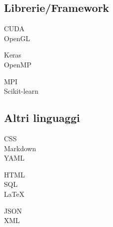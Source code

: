 \documentclass[curriculum-vitae-ita]{subfiles}
\begin{document}
		\subsection*{Librerie/Framework}
			\begin{minipage}[t]{.3\textwidth}
				CUDA \hfill {}\\
				OpenGL \hfill {}\\
			\end{minipage}
			\hfill
			\begin{minipage}[t]{.3\textwidth}
				Keras \hfill {}\\
				OpenMP \hfill {}\\
			\end{minipage}
			\hfill
			\begin{minipage}[t]{.3\textwidth}
				MPI \hfill {}\\
				Scikit-learn \hfill {}\\
			\end{minipage}
		
		\subsection*{Altri linguaggi}
			\begin{minipage}[t]{.3\textwidth}
				CSS \hfill {}\\
				Markdown \hfill {}\\
				YAML \hfill {}\\
			\end{minipage}
			\hfill
			\begin{minipage}[t]{.3\textwidth}
				HTML \hfill {}\\
				SQL \hfill {}\\
				\LaTeX \hfill {}\\
			\end{minipage}
			\hfill
			\begin{minipage}[t]{.3\textwidth}
				JSON \hfill {}\\
				XML \hfill {}\\
			\end{minipage}
		
\end{document}
